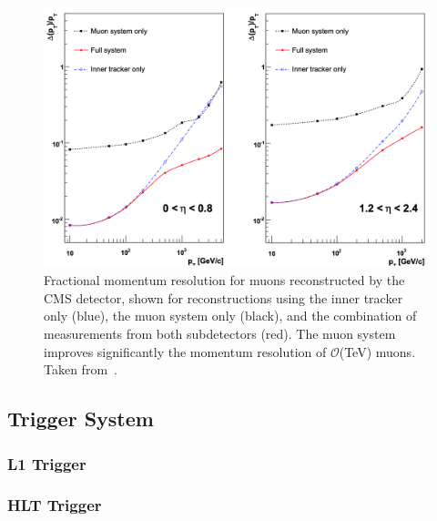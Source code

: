 \begin{figure} [htbp!]
    \centering
    \includegraphics[width=0.8\linewidth]{figures/cms/cms_tracker_vs_muon.png}
    \caption{Fractional momentum resolution for muons reconstructed by the CMS detector, shown for reconstructions using the inner tracker only (blue), the muon system only (black), and the combination of measurements from both subdetectors (red). The muon system improves significantly the momentum resolution of $\mathcal O$(TeV) muons. Taken from~\cite{Chatrchyan:2008aa}.}
    \label{fig:cms_muon_vs_tracker}
\end{figure}

\subsection{Trigger System} \label{sec:cms_trigger}

\subsubsection{L1 Trigger}

\subsubsection{HLT Trigger}
